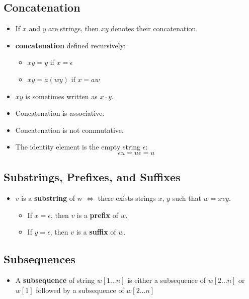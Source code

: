 \documentclass[12pt]{article}
\begin{document}
\subsection{Concatenation}
\begin{itemize}
    \item If $x$ and $y$ are strings, then $xy$ denotes their concatenation.
    \item \textbf{concatenation} defined recursively:
        \begin{itemize}
            \item $xy = y$ if $x = \epsilon$
            \item $xy = a(wy)$ if $x = aw$
        \end{itemize}
    \item $xy$ is sometimes written as $x \cdot y$.
    \item Concatenation is associative.
    \item Concatenation is not commutative.
    \item The identity element is the empty string $\epsilon$:
    \begin{equation}
        \epsilon u = u \epsilon = u
    \end{equation}
\end{itemize}

\subsection{Substrings, Prefixes, and Suffixes}
\begin{itemize}
    \item $v$ is a \textbf{substring} of w $\iff$ there exists strings $x$, $y$ such that $w = xvy$.
        \begin{itemize}
            \item If $x = \epsilon$, then $v$ is a \textbf{prefix} of $w$.
            \item If $y = \epsilon$, then $v$ is a \textbf{suffix} of $w$.
        \end{itemize}
\end{itemize}

\subsection{Subsequences}
\begin{itemize}
    \item A \textbf{subsequence} of string $w[1...n]$ is either a subsequence of $w[2...n]$ or $w[1]$ followed by a subsequence of $w[2...n]$
\end{itemize}
\end{document}
